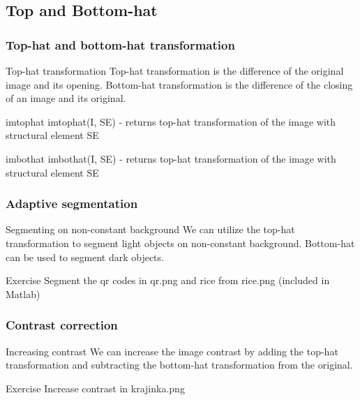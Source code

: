 \documentclass{beamer}
\begin{document}
\subsection{Top and Bottom-hat}

\begin{frame}
\frametitle{Top-hat and bottom-hat transformation} 

  \begin{block}{Top-hat transformation}
  Top-hat transformation is the difference of the original image and its opening. Bottom-hat transformation is the difference of the closing of an image and its original.
  \end{block}  
  
  \begin{block}{imtophat}
  imtophat(I, SE) - returns top-hat transformation of the image with structural element SE
  \end{block}    
  
  \begin{block}{imbothat}
  imbothat(I, SE) - returns top-hat transformation of the image with structural element SE
  \end{block}      
\end{frame}

\begin{frame}
\frametitle{Adaptive segmentation} 

  \begin{block}{Segmenting on non-constant background}
  We can utilize the top-hat transformation to segment light objects on non-constant background. Bottom-hat can be used to segment dark objects.
  \end{block}  
  
  \begin{block}{Exercise}
  Segment the qr codes in qr.png and rice from rice.png (included in Matlab)
  \end{block}    
\end{frame}

\begin{frame}
\frametitle{Contrast correction} 
  \begin{block}{Increasing contrast}
  We can increase the image contrast by adding the top-hat transformation and subtracting the bottom-hat transformation from the original.
  \end{block} 
  
  \begin{block}{Exercise}
  Increase contrast in krajinka.png
  \end{block}          
\end{frame}
\end{document}
